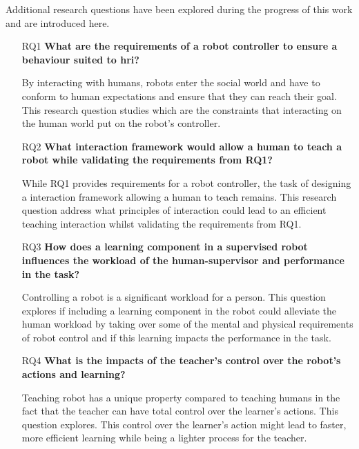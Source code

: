 Additional research questions have been explored during the progress of this
work and are introduced here.
\begin{itemize}
	\item [RQ1] \textbf{What are the requirements of a robot controller to ensure a behaviour suited to \gls{hri}?} 
	
		By interacting with humans, robots enter the social world and have to conform to human expectations and ensure that they can reach their goal. This research question studies which are the constraints that interacting on the human world put on the robot's controller. %
		
    \item [RQ2] \textbf{What interaction framework would allow a human to teach a robot while validating  the requirements from RQ1?}
    
    	While RQ1 provides requirements for a robot controller, the task of designing a interaction framework allowing a human to teach remains. This research question address what principles of interaction could lead to an efficient teaching interaction whilst validating the requirements from RQ1. 
    	
    \item [RQ3] \textbf{How does a learning component in a supervised robot influences the workload of the human-supervisor and performance in the task?}
    
        Controlling a robot is a significant workload for a person. This question explores if including a learning component in the robot could alleviate the human workload by taking over some of the mental and physical requirements of robot control and if this learning impacts the performance in the task.
    
    \item [RQ4] \textbf{What is the impacts of the teacher's control over the robot's actions and learning?} 
    
    	Teaching robot has a unique property compared to teaching humans in the fact that the teacher can have total control over the learner's actions. This question explores. This control over the learner's action might lead to faster, more efficient learning while being a lighter process for the teacher.


\end{itemize}
